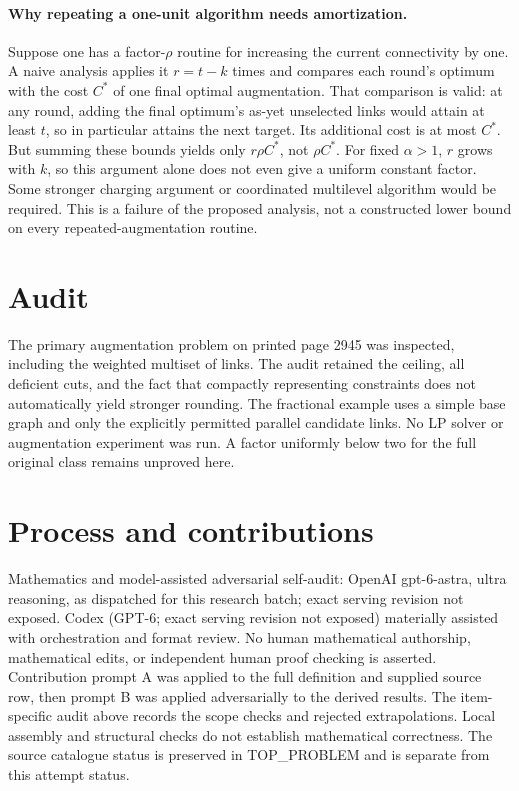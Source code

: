 \documentclass[11pt]{article}
\begin{document}
\paragraph{Why repeating a one-unit algorithm needs amortization.}
Suppose one has a factor-$\rho$ routine for increasing the current
connectivity by one. A naive analysis applies it $r=t-k$
times and compares each round's optimum with the cost $C^*$
of one final optimal augmentation. That comparison is valid: at
any round, adding the final optimum's as-yet unselected links
would attain at least $t$, so in particular attains the next
target. Its additional cost is at most $C^*$. But summing
these bounds yields only $r\rho C^*$, not $\rho C^*$.
For fixed $\alpha>1$, $r$ grows with $k$, so this
argument alone does not even give a uniform constant factor.
Some stronger charging argument or coordinated multilevel algorithm
would be required. This is a failure of the proposed analysis,
not a constructed lower bound on every repeated-augmentation routine.

\section{Audit}
The primary augmentation problem on printed page 2945 was inspected,
including the weighted multiset of links. The audit retained the
ceiling, all deficient cuts, and the fact that compactly representing
constraints does not automatically yield stronger rounding.
The fractional example uses a simple base graph and only the
explicitly permitted parallel candidate links. No LP solver or
augmentation experiment was run. A factor uniformly below two
for the full original class remains unproved here.

\section{Process and contributions}
Mathematics and model-assisted adversarial self-audit: OpenAI gpt-6-astra, ultra reasoning, as dispatched for this research batch; exact serving revision not exposed. Codex (GPT-6; exact serving revision not exposed) materially assisted with orchestration and format review. No human mathematical authorship, mathematical edits, or independent human proof checking is asserted.
Contribution prompt A was applied to the full definition and supplied source row, then prompt B was applied adversarially to the derived results. The item-specific audit above records the scope checks and rejected extrapolations. Local assembly and structural checks do not establish mathematical correctness. The source catalogue status is preserved in TOP\_PROBLEM and is separate from this attempt status.
\end{document}
